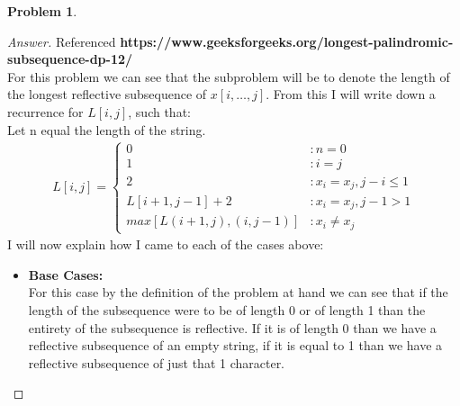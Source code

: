 \documentclass[11pt]{article}
\theoremstyle{definition}
\theoremstyle{definition}
\newtheorem{required}{Problem}
\theoremstyle{definition}
\begin{document}
\begin{required}
\begin{enumerate}[label=(\alph*)]
\begin{proof}[Answer] Referenced \textbf{https://www.geeksforgeeks.org/longest-palindromic-subsequence-dp-12/} \\

For this problem we can see that the subproblem will be to denote the length of the longest reflective subsequence of $x[i, \ldots, j]$.
From this I will write down a recurrence for $L[i, j]$, such that: \\
Let n equal the length of the string.
\begin{align*}
L[i, j] = \begin{cases}
0 &: n = 0 \\
1 &: i = j \\
2 &: x_i = x_j, j-i \leq 1\\
L[i + 1, j - 1] + 2 &: x_i = x_j, j-1 > 1\\
max[L(i + 1, j), (i, j - 1)] &:  x_i \neq x_j
\end{cases}
\end{align*}
I will now explain how I came to each of the cases above: \\
\begin{itemize}
\item \textbf{Base Cases:} \\
For this case by the definition of the problem at hand we can see that if the length of the subsequence were to be of length 0 or of length 1 than the entirety of the subsequence is reflective. If it is of length 0 than we have a reflective subsequence of an empty string, if it is equal to 1 than we have a reflective subsequence of just that 1 character.\\


\end{itemize}
\end{proof}
\end{enumerate}
\end{required}
\end{document}

